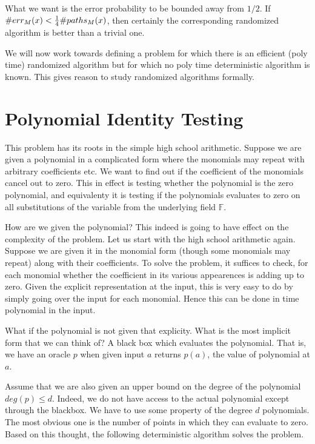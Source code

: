 What we want is the error probability to be bounded away from $1/2$. If $\#err_{M}(x) < \frac{1}{4} \#paths_{M}(x)$, then 
certainly the corresponding randomized algorithm is better than a trivial one.

We will now work towards defining a problem for which there is an efficient (poly time) randomized algorithm but for which 
no poly time deterministic algorithm is known. This gives reason to study randomized algorithms formally.


\section{Polynomial Identity Testing}

This problem has its roots in the simple high school
arithmetic. Suppose we are given a polynomial in a complicated form
where the monomials may repeat with arbitrary coefficients etc. We
want to find out if the coefficient of the monomials cancel out to
zero. This in effect is testing whether the polynomial is the zero
polynomial, and equivalenty it is testing if the polynomials evaluates
to zero on all substitutions of the variable from the underlying field
$\mathbb{F}$.

How are we given the polynomial? This indeed is going to have effect
on the complexity of the problem.  Let us start with the high school
arithmetic again. Suppose we are given it in the monomial form (though
some monomials may repeat) along with their coefficients. To solve the
problem, it suffices to check, for each monomial whether the
coefficient in its various appearences is adding up to zero. Given the
explicit representation at the input, this is very easy to do by
simply going over the input for each monomial. Hence this can be done
in time polynomial in the input.

What if the polynomial is not given that explicity. What is the most
implicit form that we can think of? A black box which evaluates the polynomial.
That is, we have an oracle $p$ when given input $a$ returns $p(a)$, the value of polynomial 
at $a$.


Assume that we are also given an upper bound on the degree of the
polynomial $deg(p) \leq d$.  Indeed, we do not have access to the
actual polynomial except through the blackbox. We have to use some
property of the degree $d$ polynomials. The most obvious one is the
number of points in which they can evaluate to zero. Based on this thought, 
the following deterministic algorithm solves the problem.

